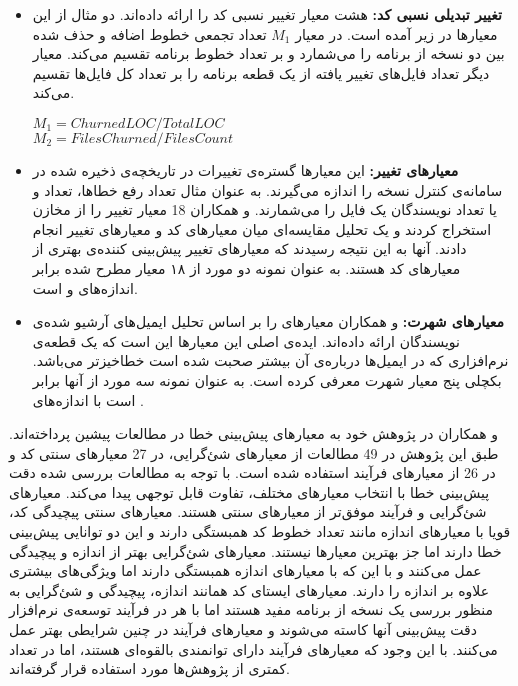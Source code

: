 \begin{itemize}
\item \textbf{تغییر تبدیلی نسبی کد: }
 هشت معیار تغییر  نسبی کد را ارائه داده‌اند\cite{nagappan2005use}. دو مثال از این معیارها در زیر آمده است.  در معیار $M_1 $ تعداد تجمعی خطوط اضافه و حذف شده بین دو نسخه از برنامه را می‌شمارد و بر تعداد خطوط برنامه تقسیم می‌کند. معیار دیگر تعداد فایل‌های تغییر یافته از یک قطعه برنامه را بر تعداد  کل فایل‌ها تقسیم می‌کند. 
\begin{latin}
\baselineskip=1.1cm
$M_1 = Churned LOC / Total LOC$\\
$M_2 = Files Churned / Files Count$
\end{latin}

\item \textbf{معیارهای تغییر: }
این معیارها  گستره‌ی تغییرات در تاریخچه‌ی ذخیره شده در سامانه‌ی کنترل نسخه را اندازه می‌گیرند. به عنوان مثال تعداد رفع خطاها، تعداد  و یا تعداد نویسندگان یک فایل را می‌شمارند.  و همکاران 18 معیار تغییر را از مخازن  استخراج کردند و یک تحلیل مقایسه‌ای میان معیارهای کد و معیارهای تغییر انجام دادند. آنها به این نتیجه رسیدند که معیارهای تغییر پیش‌بینی کننده‌ی بهتری از معیارهای کد هستند.  به عنوان نمونه دو مورد از ۱۸ معیار مطرح شده برابر اندازه‌های  و  است.

\item \textbf{معیارهای شهرت: }
  و همکاران معیارهای  را بر اساس تحلیل ایمیل‌های آرشیو شده‌ی نویسندگان ارائه داده‌اند. ایده‌ی اصلی این معیارها این است که یک قطعه‌ی  نرم‌افزاری که در ایمیل‌ها درباره‌ی آن بیشتر صحبت شده است خطاخیزتر می‌باشد\cite{bacchelli2010popular}.  بکچلی پنج معیار شهرت معرفی کرده است.  به عنوان نمونه سه مورد از آنها  برابر است با اندازه‌های . \\
\end{itemize}


 و همکاران در پژوهش خود به  معیارهای پیش‌بینی خطا در مطالعات پیشین پرداخته‌اند.  طبق این پژوهش در 49\lr{\%} مطالعات از معیارهای شئ‌گرایی، در 27\lr{\%} معیارهای سنتی کد و در 26 \lr{\%} از معیارهای فرآیند استفاده شده است. با توجه به مطالعات بررسی شده دقت پیش‌بینی خطا  با انتخاب معیارهای مختلف، تفاوت قابل توجهی  پیدا می‌کند. معیارهای شئ‌گرایی و فرآیند موفق‌تر از معیارهای سنتی هستند. معیارهای سنتی  پیچیدگی کد، قویا با معیارهای اندازه مانند تعداد خطوط کد همبستگی دارند و این دو توانایی پیش‌بینی خطا دارند اما جز بهترین معیارها نیستند. معیارهای شئ‌گرایی بهتر از اندازه و پیچیدگی عمل می‌کنند و با این که با معیارهای اندازه همبستگی دارند اما ویژگی‌های بیشتری علاوه بر اندازه را دارند. معیارهای ایستای کد همانند اندازه، پیچیدگی و شئ‌گرایی به منظور بررسی یک نسخه از برنامه مفید هستند اما با هر  در فرآیند توسعه‌ی نرم‌افزار دقت پیش‌بینی آنها کاسته می‌شوند و معیارهای فرآیند در چنین شرایطی بهتر عمل می‌کنند.  با این وجود  که  معیارهای فرآیند‌  دارای توانمندی بالقوه‌ای  هستند، اما در تعداد کمتری از پژوهش‌ها مورد استفاده قرار گرفته‌اند\cite{radjenovic2013software}. \\
 
